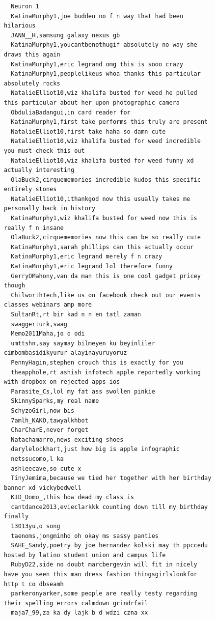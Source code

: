 \begin{figure}[htpb]
  \centering
  \begin{verbatim}
  Neuron 1
  KatinaMurphy1,joe budden no f n way that had been hilarious
  JANN__H,samsung galaxy nexus gb
  KatinaMurphy1,youcantbenothugif absolutely no way she draws this again
  KatinaMurphy1,eric legrand omg this is sooo crazy
  KatinaMurphy1,peoplelikeus whoa thanks this particular absolutely rocks
  NatalieElliot10,wiz khalifa busted for weed he pulled this particular about her upon photographic camera
  ObduliaBadangui,in card reader for
  KatinaMurphy1,first take performs this truly are present
  NatalieElliot10,first take haha so damn cute
  NatalieElliot10,wiz khalifa busted for weed incredible you must check this out
  NatalieElliot10,wiz khalifa busted for weed funny xd actually interesting
  OlaBuck2,cirquememories incredible kudos this specific entirely stones
  NatalieElliot10,ithankgod now this usually takes me personally back in history
  KatinaMurphy1,wiz khalifa busted for weed now this is really f n insane
  OlaBuck2,cirquememories now this can be so really cute
  KatinaMurphy1,sarah phillips can this actually occur
  KatinaMurphy1,eric legrand merely f n crazy
  KatinaMurphy1,eric legrand lol therefore funny
  GerryOMahony,van da man this is one cool gadget pricey though
  ChilworthTech,like us on facebook check out our events classes webinars amp more
  SultanRt,rt bir kad n n en tatl zaman
  swaggerturk,swag
  Memo2011Maha,jo o odi
  umttshn,say saymay bilmeyen ku beyinliler cimbombasidikyurur alayinayuruyoruz
  PennyHagin,stephen crouch this is exactly for you
  theapphole,rt ashish infotech apple reportedly working with dropbox on rejected apps ios
  Parasite_Cs,lol my fat ass swollen pinkie
  SkinnySparks,my real name
  SchyzoGirl,now bis
  7amlh_KAKO,tawyalkhbot
  CharCharE,never forget
  Natachamarro,news exciting shoes
  darylelockhart,just how big is apple infographic
  netssucomo,l ka
  ashleecave,so cute x
  TinyJemima,because we tied her together with her birthday banner xd vickybedwell
  KID_Domo_,this how dead my class is
  cantdance2013,evieclarkkk counting down till my birthday finally
  13013yu,o song
  taenoms,jongminho oh okay ms sassy panties
  SAHE_Sandy,poetry by joe hernandez kolski may th ppccedu hosted by latino student union and campus life
  RubyD22,side no doubt marcbergevin will fit in nicely have you seen this man dress fashion thingsgirlslookfor http t co dbseamh
  parkeronyarker,some people are really testy regarding their spelling errors calmdown grindrfail
  maja7_99,za ka dy lajk b d wdzi czna xx

\end{verbatim}
\end{figure}
